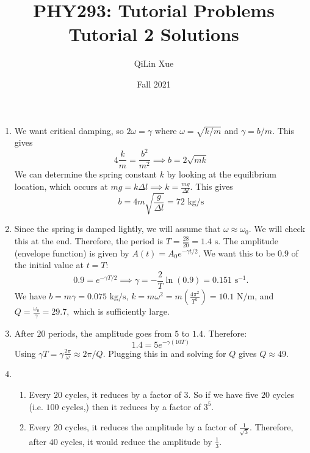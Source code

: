 \documentclass{article}
\title{PHY293: Tutorial Problems \\ \textbf{Tutorial 2 Solutions}}
\author{QiLin Xue}
\date{Fall 2021}
\begin{document}
\maketitle
\begin{enumerate}
    \item We want critical damping, so $2\omega = \gamma$ where $\omega=\sqrt{k/m}$ and $\gamma=b/m$. This gives 
    \begin{equation}
        4\frac{k}{m} =  \frac{b^2}{m^2} \implies b = 2\sqrt{mk}
    \end{equation}
    We can determine the spring constant $k$ by looking at the equilibrium location, which occurs at $mg=k\Delta l \implies k = \frac{mg}{\Delta l}$. This gives 
    \begin{equation}
        b = 4m\sqrt{\frac{g}{\Delta l}} = \boxed{\text{72 kg/s}}
    \end{equation}
    \item Since the spring is damped lightly, we will assume that $\omega \approx \omega_0$. We will check this at the end. Therefore, the period is $T = \frac{28}{20} = 1.4\text{ s}$. The amplitude (envelope function) is given by $A(t) = A_0 e^{-\gamma t/2}.$ We want this to be $0.9$ of the initial value at $t=T$: 
    \begin{equation}
        0.9 = e^{-\gamma T/2} \implies \gamma = -\frac{2}{T}\ln(0.9) = 0.151\text{ s}^{-1}.
    \end{equation} 
    We have $b=m\gamma = 0.075\text{ kg/s}$, $k = m\omega^2 = m\left(\frac{4\pi^2}{T^2}\right) = 10.1 \text{ N/m}$, and $Q=\frac{\omega_0}{\gamma} = 29.7,$ which is sufficiently large.
    \item After $20$ periods, the amplitude goes from $5$ to $1.4$. Therefore: 
    \begin{equation}
        1.4 = 5e^{-\gamma(10 T)}
    \end{equation}
    Using $\gamma T = \gamma \frac{2\pi}{\omega} \approx 2\pi/Q.$ Plugging this in and solving for $Q$ gives $Q\approx 49.$
    \item \begin{enumerate}
        \item Every $20$ cycles, it reduces by a factor of $3$. So if we have five $20$ cycles (i.e. $100$ cycles,) then it reduces by a factor of $3^5.$
        \item Every $20$ cycles, it reduces the amplitude by a factor of $\frac{1}{\sqrt{3}}$. Therefore, after $40$ cycles, it would reduce the amplitude by $\frac{1}{3}$.
    \end{enumerate}

\end{enumerate}
\end{document}
